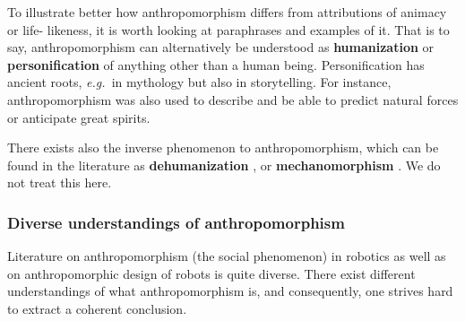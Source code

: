 \documentclass{frontiersSCNS} %
\newcommand{\eg}{{\textit{e.g.~}}}
\begin{document}
To illustrate better how anthropomorphism differs from attributions of animacy or life-
likeness, it is worth looking at paraphrases and examples of it. That is to say, 
anthropomorphism can alternatively be understood as \textbf{humanization} or 
\textbf{personification} of anything other than a human being. Personification has 
ancient roots, \eg in mythology but also in storytelling. For instance, anthropomorphism was also 
used to describe and be able to predict natural forces or anticipate great spirits.

There exists also the inverse phenomenon to anthropomorphism, which can be found in the literature as \textbf{dehumanization} \citep{haslam_dehumanization:_2006}, or \textbf{mechanomorphism} \citep{caporael_anthropomorphism_1986}. We do not treat this here.





\subsubsection{Diverse understandings of anthropomorphism\\}

Literature on anthropomorphism (the social phenomenon) in robotics as well as on
anthropomorphic design of robots is quite diverse. There exist different understandings of what anthropomorphism is, and consequently, one strives hard to
extract a coherent conclusion. 
\end{document}
